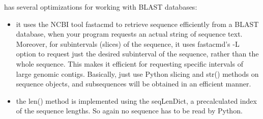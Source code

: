 \documentclass{howto}
\begin{document}
 has several optimizations for working with BLAST databases:

\begin{itemize}
\item
it uses the NCBI tool fastacmd to retrieve sequence efficiently from a BLAST database, when your program requests an actual string of sequence text.  Moreover, for subintervals (slices) of the sequence, it uses fastacmd's -L option to request just the desired subinterval of the sequence, rather than the whole sequence.  This makes it efficient for requesting specific intervals of large genomic contigs.  Basically, just use Python slicing and str() methods on sequence objects, and subsequences will be obtained in an efficient manner.

\item 
the len() method is implemented using the seqLenDict, a precalculated index of the sequence lengths.  So again no sequence has to be read by Python.

\end{itemize}
\end{document}

